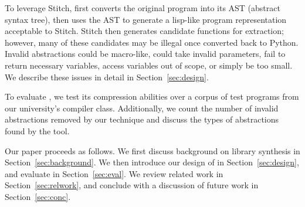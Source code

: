 To leverage Stitch, \toolname first converts the original \ptwo{} program into its AST (abstract syntax tree), then
uses the AST to generate a lisp-like program representation
acceptable to Stitch.  Stitch then generates candidate
functions for extraction; however, many of these candidates
may be illegal once converted back to Python.  Invalid abstractions could be macro-like, could take invalid parameters, fail to return necessary variables, access variables out of scope, or simply be too small. We describe these issues in detail in Section~\ref{sec:design}. 


To evaluate \toolname, we test its compression abilities over a corpus of \corpusSize test programs from our university's compiler class. Additionally, we count the number of invalid abstractions removed by our technique and discuss the types of abstractions found by the tool.

Our paper proceeds as follows.  We first discuss background on library synthesis in Section~\ref{sec:background}.  We then introduce our design of \toolname{} in Section~\ref{sec:design}, and evaluate in Section~\ref{sec:eval}.  We review related work in Section~\ref{sec:relwork}, and conclude with a discussion
of future work in Section~\ref{sec:conc}.



